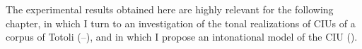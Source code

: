 The experimental results obtained here are highly relevant for the following chapter, in which  I turn to an investigation of the tonal realizations of CIUs of a corpus of Totoli (--), and in which I propose an intonational model of the CIU (). 






